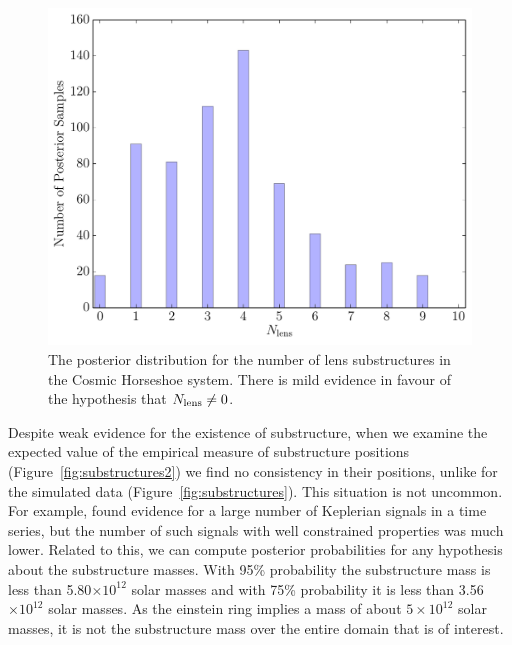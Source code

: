 \documentclass[useAMS,usenatbib]{mn2e}
\begin{document}
\begin{figure}
\begin{center}
\includegraphics[scale=0.4]{N_lens2.pdf}
\caption{The posterior distribution for the number of lens substructures
in the Cosmic Horseshoe system. There is mild evidence in favour of the
hypothesis that $N_{\rm lens} \neq 0$.\label{fig:N_lens2}}
\end{center}
\end{figure}

Despite weak evidence for the existence of substructure, when we examine the
expected value of the empirical measure of substructure positions
(Figure~\ref{fig:substructures2}) we find no consistency in their positions,
unlike for the simulated data (Figure~\ref{fig:substructures}). This situation
is not uncommon. For example, \citet{exoplanet} found evidence for a large
number of Keplerian signals in a time series, but the number of such signals
with well constrained properties was much lower. Related to this, we can
compute posterior probabilities for any hypothesis about the substructure
masses. With 95\% probability the substructure mass is less than 5.80$\times 10^{12}$ solar masses and with 75\% probability it is less than 3.56$\times 10^{12}$ solar masses. As the einstein ring implies a mass of about $5 \times 10^{12}$
solar masses, it is not the substructure mass over the entire domain
that is of interest.
\end{document}
